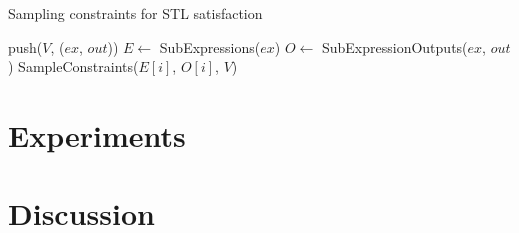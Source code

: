 \begin{algorithm}
\caption{Sampling constraints for STL satisfaction}
    \label{alg:sampling_constraints}
\begin{algorithmic}[1]
        \State push($V$, ($ex$, $out$)) \label{line:sc_push}
    \Else
        \State $E \gets$ SubExpressions($ex$) \label{line:sc_subexpr}
        \State $O \gets$ SubExpressionOutputs($ex$, $out$) \label{line:sc_subexpr_out}
            \State SampleConstraints($E[i]$, $O[i]$, $V$) \label{line:sc_recurse}    
        \EndFor
    \EndIf
    \EndFunction
\end{algorithmic}
\end{algorithm}

\section{Experiments}

\section{Discussion}